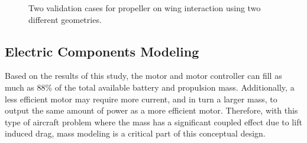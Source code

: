 \documentclass[conf]{new-aiaa}
\begin{document}
\begin{figure}[htbp]
    \centering
    \qquad
    \caption{Two validation cases for propeller on wing interaction using two different geometries.}
    \label{f:epemaval}
\end{figure}

\subsection{Electric Components Modeling}

Based on the results of this study, the motor and motor controller can fill as much as 88\% of the total available battery and propulsion mass. Additionally, a less efficient motor may require more current, and in turn a larger mass, to output the same amount of power as a more efficient motor. Therefore, with this type of aircraft problem where the mass has a significant coupled effect due to lift induced drag, mass modeling is a critical part of this conceptual design.
\end{document}
